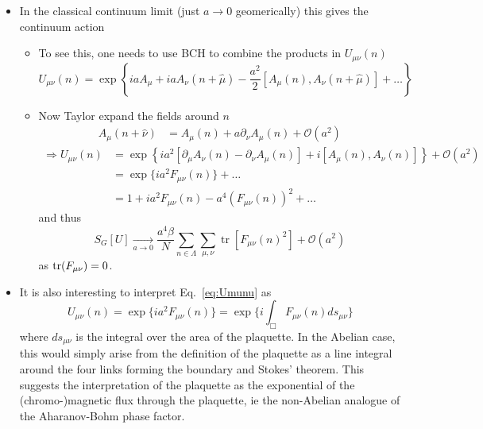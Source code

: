 \begin{itemize}
  \item In the classical continuum limit (just $a \rightarrow 0$ geomerically) this gives the continuum action 
  \begin{itemize}
      \item To see this, one needs to use BCH to combine the products in $U_{\mu \nu}(n)$
      \begin{equation}
          U_{\mu \nu}(n) = \exp \left\{ i a A_\mu + i a A_\nu(n + \hat{\mu}) - \frac{a^2}{2}[A_\mu(n), A_\nu(n + \hat{\mu})] + \ldots\right\}
      \end{equation}
      \item Now Taylor expand the fields around $n$
      \begin{align}
          A_\mu(n + \hat{\nu}) &= A_\mu(n) + a \partial_\nu A_\mu(n) + \mathcal{O}(a^2) 
      \end{align}
     \begin{align}
          \Rightarrow U_{\mu \nu}(n) &= \exp\left\{i a^2 [\partial_\mu A_\nu(n) - \partial_\nu A_\mu(n)] + i [A_\mu(n), A_\nu(n)] \right\} + \mathcal{O}(a^2) \nonumber \\
          &= \exp\{i a^2 F_{\mu \nu}(n)\} + \ldots\nonumber \\
          &= 1 + i a^2 F_{\mu \nu}(n) - a^4 (F_{\mu \nu}(n))^2 + \ldots \label{eq:Umunu}
      \end{align}
      and thus
      \begin{equation}
          S_G[U] \underset{a\rightarrow0}{\longrightarrow}\frac{a^4 \beta}{N} \sum_{n \in \Lambda}\sum_{\mu, \nu} \operatorname{tr}[F_{\mu \nu}(n)^2] + \mathcal{O}(a^2)
      \end{equation}
      as ${\rm tr}(F_{\mu\nu})=0$.
  \end{itemize}
  \item It is also interesting to interpret Eq.~\eqref{eq:Umunu} as
  \begin{equation}
      U_{\mu \nu}(n) = \exp\{i a^2 F_{\mu \nu}(n)\} =\exp\{i \int_\Box F_{\mu \nu}(n)ds_{\mu\nu}\}
  \end{equation}
  where $ds_{\mu\nu}$ is the integral over the area of the plaquette. In the Abelian case, this would simply arise from the definition of the plaquette as a line integral around the four links forming the boundary and Stokes' theorem. This suggests the interpretation of the plaquette as the exponential of the (chromo-)magnetic flux through the plaquette, ie the non-Abelian analogue of the Aharanov-Bohm phase factor.
\end{itemize}



